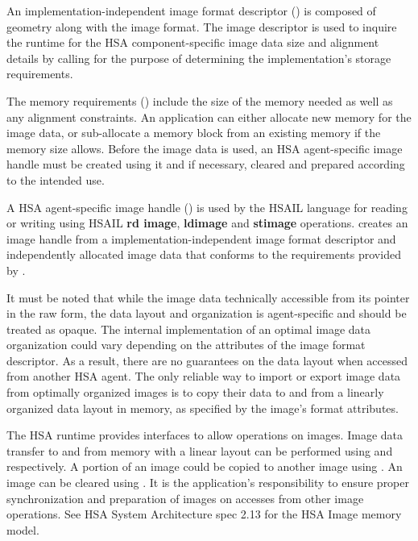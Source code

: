 \documentclass[final]{book}
\newcommand{\reffun}[1]{\textbf{#1}}
\newcommand{\refhsl}[1]{\reffun{#1}}
\begin{document}
An implementation-independent image format descriptor
() is composed of geometry along with the
image format. The image descriptor is used to inquire the runtime for the HSA
component-specific image data size and alignment details by calling
 for the purpose of determining the
implementation's storage requirements.

The memory requirements () include the size of the
memory needed as well as any alignment constraints. An application can either
allocate new memory for the image data, or sub-allocate a memory block from an
existing memory if the memory size allows. Before the image data is used, an HSA
agent-specific image handle must be created using it and if necessary, cleared
and prepared according to the intended use.

A HSA agent-specific image handle () is used by
the HSAIL language for reading or writing using HSAIL \refhsl{rd image},
\refhsl{ldimage} and \refhsl{stimage}
operations.  creates an image handle from a
implementation-independent image format descriptor and independently allocated
image data that conforms to the requirements provided by
.

It must be noted that while the image data technically accessible from its
pointer in the raw form, the data layout and organization is agent-specific and
should be treated as opaque. The internal implementation of an optimal image
data organization could vary depending on the attributes of the image format
descriptor. As a result, there are no guarantees on the data layout when
accessed from another HSA agent. The only reliable way to import or export image
data from optimally organized images is to copy their data to and from a
linearly organized data layout in memory, as specified by the image's format
attributes.

The HSA runtime provides interfaces to allow operations on images. Image data
transfer to and from memory with a linear layout can be performed using
 and  respectively. A
portion of an image could be copied to another image using
. An image can be cleared using
. It is the application's responsibility to ensure
proper synchronization and preparation of images on accesses from other image
operations. See HSA System Architecture spec 2.13 for the HSA Image memory
model.
\end{document}
